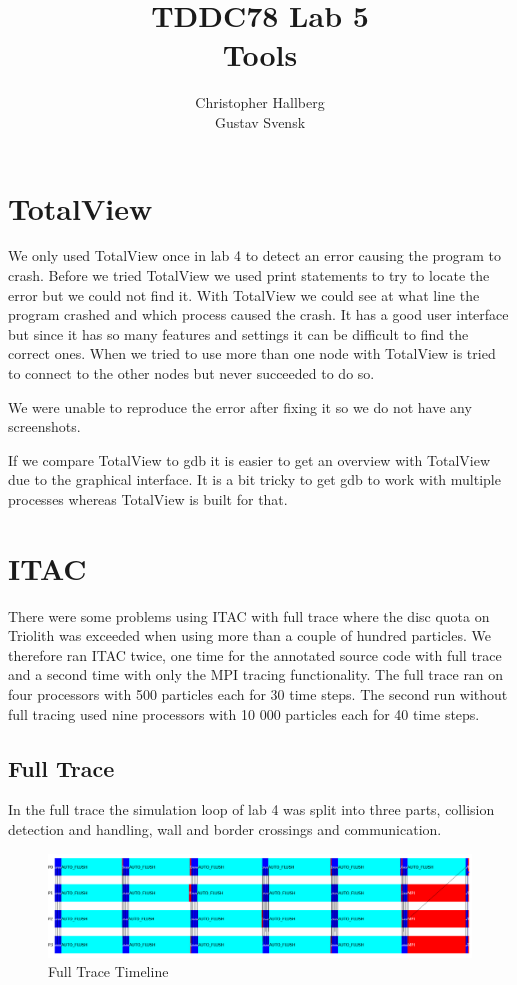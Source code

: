 \documentclass[a4paper, 12pt]{article}
\begin{document}
\title{TDDC78 Lab 5\\
        Tools }
\author{Christopher Hallberg \\
        Gustav Svensk}
\maketitle

\thispagestyle{empty}

\newpage
\setcounter{page}{1}
\tableofcontents
\newpage

\section{TotalView}
We only used TotalView once in lab 4 to detect an error causing the program to
crash. Before we tried TotalView we used print statements to try to locate the
error but we could not find it. With TotalView we could see at what line the
program crashed and which process caused the crash. It has a good user interface
but since it has so many features and settings it can be difficult to find the
correct ones. When we tried to use more than one node with TotalView is tried to
connect to the other nodes but never succeeded to do so.

We were unable to reproduce the error after fixing it so we do not have any
screenshots.

If we compare TotalView to gdb it is easier to get an overview with TotalView
due to the graphical interface. It is a bit tricky to get gdb to work with
multiple processes whereas TotalView is built for that.

\section{ITAC}
There were some problems using ITAC with full trace where the disc quota on Triolith
was exceeded when using more than a couple of hundred particles. We therefore
ran ITAC twice, one time for the annotated source code with full trace and a
second time with only the MPI tracing functionality. The full trace ran on
four processors with 500 particles each for 30 time steps. The second run without
full tracing used nine processors with 10 000 particles each for 40 time steps.

\subsection{Full Trace}
In the full trace the simulation loop of lab 4 was split into three parts,
collision detection and handling, wall and border crossings and communication. 

\begin{figure}[h]
        \centering
        \includegraphics[width=\textwidth]{event_timeline_loop_state.png}
        \caption{Full Trace Timeline}
        \label{fig:ftt}
\end{figure}
\end{document}
